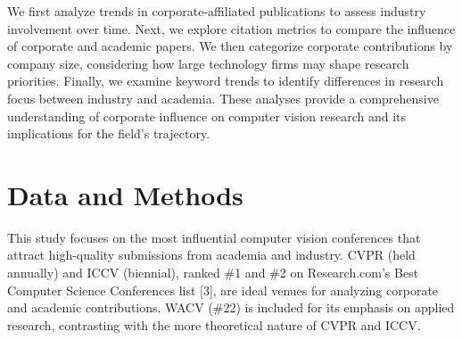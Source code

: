 \documentclass{article}
\begin{document}
We first analyze trends in corporate-affiliated publications to assess industry involvement over time. Next, we explore citation metrics to compare the influence of corporate and academic papers. We then categorize corporate contributions by company size, considering how large technology firms may shape research priorities. Finally, we examine keyword trends to identify differences in research focus between industry and academia. These analyses provide a comprehensive understanding of corporate influence on computer vision research and its implications for the field’s trajectory.

\section{Data and Methods}
\vspace{-5pt}
This study focuses on the most influential computer vision conferences that attract high-quality submissions from academia and industry. CVPR (held annually) and ICCV (biennial), ranked \#1 and \#2 on Research.com’s Best Computer Science Conferences list [3], are ideal venues for analyzing corporate and academic contributions. WACV (\#22) is included for its emphasis on applied research, contrasting with the more theoretical nature of CVPR and ICCV.
\end{document}
